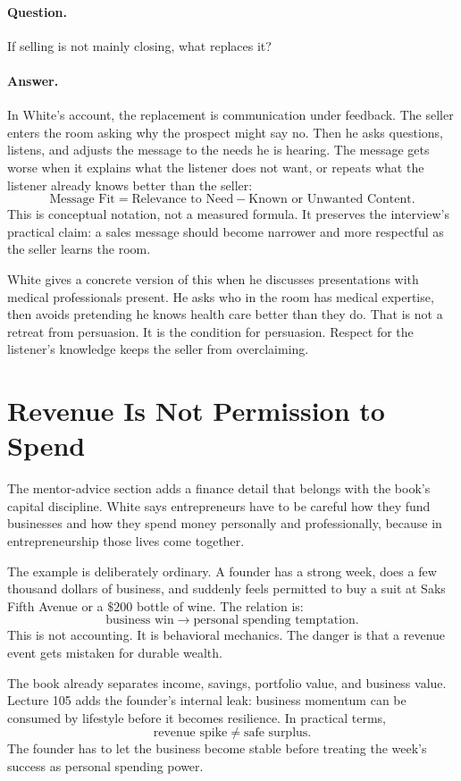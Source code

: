 \documentclass[11pt,oneside]{book}
\begin{document}
\paragraph{Question.}
If selling is not mainly closing, what replaces it?

\paragraph{Answer.}
In White's account, the replacement is communication under feedback. The seller enters the room asking why the prospect might say no. Then he asks questions, listens, and adjusts the message to the needs he is hearing. The message gets worse when it explains what the listener does not want, or repeats what the listener already knows better than the seller:
\[
\text{Message Fit}
=
\text{Relevance to Need}
-
\text{Known or Unwanted Content}.
\]
This is conceptual notation, not a measured formula. It preserves the interview's practical claim: a sales message should become narrower and more respectful as the seller learns the room.

White gives a concrete version of this when he discusses presentations with medical professionals present. He asks who in the room has medical expertise, then avoids pretending he knows health care better than they do. That is not a retreat from persuasion. It is the condition for persuasion. Respect for the listener's knowledge keeps the seller from overclaiming.

\section{Revenue Is Not Permission to Spend}

The mentor-advice section adds a finance detail that belongs with the book's capital discipline. White says entrepreneurs have to be careful how they fund businesses and how they spend money personally and professionally, because in entrepreneurship those lives come together.

The example is deliberately ordinary. A founder has a strong week, does a few thousand dollars of business, and suddenly feels permitted to buy a suit at Saks Fifth Avenue or a \(\$200\) bottle of wine. The relation is:
\[
\text{business win}
\longrightarrow
\text{personal spending temptation}.
\]
This is not accounting. It is behavioral mechanics. The danger is that a revenue event gets mistaken for durable wealth.

The book already separates income, savings, portfolio value, and business value. Lecture 105 adds the founder's internal leak: business momentum can be consumed by lifestyle before it becomes resilience. In practical terms,
\[
\text{revenue spike}\neq \text{safe surplus}.
\]
The founder has to let the business become stable before treating the week's success as personal spending power.
\end{document}
